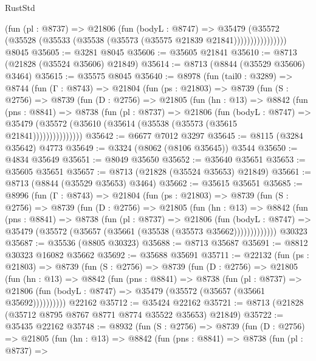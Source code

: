 \begin{lexlean}{RustStd}
\begin{coremodule}
                    (fun (pl : @8737) =>
                    @21806
                      (fun (bodyL : @8747) =>
                      @35479
                        (@35572
                          (@35528 (@35533 (@35538 (@35573 (@35575 @21839 @21841))))))))))))))))
    @8045
@35605 := @3281 @8045
@35606 := @35605 @21841
@35610 := @8713 (@21828 (@35524 @35606) @21849)
@35614 := @8713 (@8844 (@35529 @35606) @3464)
@35615 := @35575 @8045
@35640 := @8978
    (fun (tail0 : @3289) =>
    @8744
      (fun (Γ : @8743) =>
      @21804
        (fun (ps : @21803) =>
        @8739
          (fun (S : @2756) =>
          @8739
            (fun (D : @2756) =>
            @21805
              (fun (hn : @13) =>
              @8842
                (fun (pns : @8841) =>
                @8738
                  (fun (pl : @8737) =>
                  @21806
                    (fun (bodyL : @8747) =>
                    @35479 (@35572 (@35610 (@35614 (@35538 (@35573 (@35615 @21841)))))))))))))))
@35642 := @6677 @7012 @3297
@35645 := @8115 (@3284 @35642) @4773
@35649 := @3324 (@8062 (@8106 @35645)) @3544
@35650 := @4834 @35649
@35651 := @8049 @35650
@35652 := @35640 @35651
@35653 := @35605 @35651
@35657 := @8713 (@21828 (@35524 @35653) @21849)
@35661 := @8713 (@8844 (@35529 @35653) @3464)
@35662 := @35615 @35651
@35685 := @8996
    (fun (Γ : @8743) =>
    @21804
      (fun (ps : @21803) =>
      @8739
        (fun (S : @2756) =>
        @8739
          (fun (D : @2756) =>
          @21805
            (fun (hn : @13) =>
            @8842
              (fun (pns : @8841) =>
              @8738
                (fun (pl : @8737) =>
                @21806
                  (fun (bodyL : @8747) =>
                  @35479 (@35572 (@35657 (@35661 (@35538 (@35573 @35662)))))))))))))
    @30323
@35687 := @35536 (@8805 @30323)
@35688 := @8713 @35687
@35691 := @8812 @30323 @16082 @35662
@35692 := @35688 @35691
@35711 := @22132
    (fun (ps : @21803) =>
    @8739
      (fun (S : @2756) =>
      @8739
        (fun (D : @2756) =>
        @21805
          (fun (hn : @13) =>
          @8842
            (fun (pns : @8841) =>
            @8738
              (fun (pl : @8737) =>
              @21806 (fun (bodyL : @8747) => @35479 (@35572 (@35657 (@35661 @35692))))))))))
    @22162
@35712 := @35424 @22162
@35721 := @8713 (@21828 (@35712 @8795 @8767 @8771 @8774 @35522 @35653) @21849)
@35722 := @35435 @22162
@35748 := @8932
    (fun (S : @2756) =>
    @8739
      (fun (D : @2756) =>
      @21805
        (fun (hn : @13) =>
        @8842
          (fun (pns : @8841) =>
          @8738
            (fun (pl : @8737) =>

\end{coremodule}
\end{lexlean}
